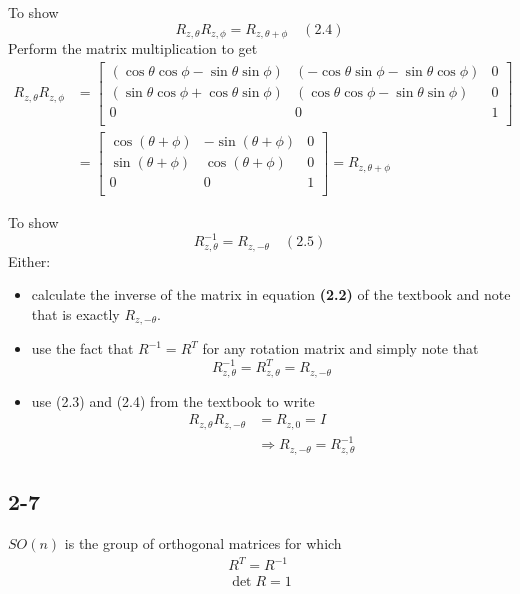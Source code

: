 To show
\begin{equation*}
R_{z,\theta} R_{z,\phi}= R_{z,\theta+\phi} \quad (2.4)
\end{equation*}
Perform the matrix multiplication to get
\begin{align*} 
R_{z,\theta} R_{z,\phi} &= \left[\begin{array}{ccc} 
(\cos\theta \cos \phi - \sin\theta \sin \phi) & (-\cos\theta \sin\phi - \sin\theta \cos\phi) & 0 \\  
(\sin\theta \cos\phi +\cos\theta \sin\phi) & (\cos\theta \cos \phi - \sin\theta \sin \phi) & 0 \\ 
0 & 0 & 1 \\   
\end{array}\right] \\
&=\left[\begin{array}{ccc} 
\cos(\theta + \phi)& -\sin(\theta + \phi) & 0 \\  
\sin(\theta + \phi) & \cos(\theta + \phi) & 0 \\ 
0 & 0 & 1 \\   
\end{array}\right] = R_{z,\theta+\phi}
\end{align*}

To show
\begin{equation*}
R_{z,\theta}^{-1} = R_{z,-\theta} \quad (2.5)
\end{equation*}
Either:
\begin{itemize}
	\item calculate the inverse of the matrix in equation \textbf{(2.2)} of the textbook and note that is exactly $R_{z,-\theta}$.
	\item use the fact that $R^{-1}=R^T$ for any rotation matrix and simply note that
	\begin{equation*}
	R_{z,\theta}^{-1} = R_{z,\theta}^{T} = R_{z,-\theta}
	\end{equation*}
	\item use (2.3) and (2.4) from the textbook to write
	\begin{align*}
	R_{z,\theta} R_{z,-\theta} &= R_{z,0} = I \\
	&\Rightarrow R_{z,-\theta} = R_{z,\theta}^{-1}
	\end{align*}
\end{itemize}

\subsection*{2-7}
$SO(n)$ is the group of orthogonal matrices for which 
\begin{align*}
R^T=R^{-1} \\
\det R=1
\end{align*}


